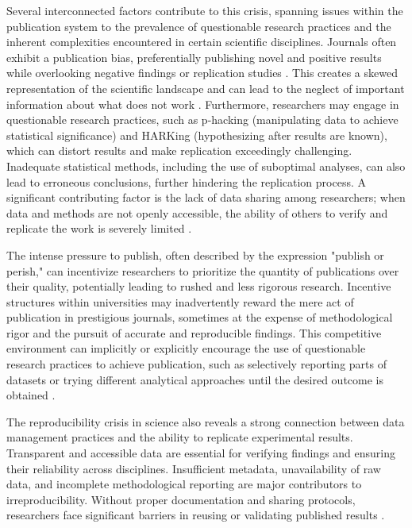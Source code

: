\documentclass[final]{rc-book-2.14}
\begin{document}
Several interconnected factors contribute to this crisis, spanning issues within the publication system to the prevalence of questionable research practices and the inherent complexities encountered in certain scientific disciplines. Journals often exhibit a publication bias, preferentially publishing novel and positive results while overlooking negative findings or replication studies \cite{ioannidis2005most}. This creates a skewed representation of the scientific landscape and can lead to the neglect of important information about what does not work \cite{collins_policy_2014}. Furthermore, researchers may engage in questionable research practices, such as p-hacking (manipulating data to achieve statistical significance) and HARKing (hypothesizing after results are known), which can distort results and make replication exceedingly challenging. Inadequate statistical methods, including the use of suboptimal analyses, can also lead to erroneous conclusions, further hindering the replication process. A significant contributing factor is the lack of data sharing among researchers; when data and methods are not openly accessible, the ability of others to verify and replicate the work is severely limited \cite{munafo_manifesto_2017}.

The intense pressure to publish, often described by the expression "publish or perish," can incentivize researchers to prioritize the quantity of publications over their quality, potentially leading to rushed and less rigorous research. Incentive structures within universities may inadvertently reward the mere act of publication in prestigious journals, sometimes at the expense of methodological rigor and the pursuit of accurate and reproducible findings. This competitive environment can implicitly or explicitly encourage the use of questionable research practices to achieve publication, such as selectively reporting parts of datasets or trying different analytical approaches until the desired outcome is obtained \cite{david_robert_grimes_modelling_2018}.

The reproducibility crisis in science also reveals a strong connection between data management practices and the ability to replicate experimental results. Transparent and accessible data are essential for verifying findings and ensuring their reliability across disciplines. Insufficient metadata, unavailability of raw data, and incomplete methodological reporting are major contributors to irreproducibility. Without proper documentation and sharing protocols, researchers face significant barriers in reusing or validating published results \cite{samuel_understanding_2021}.
\end{document}
